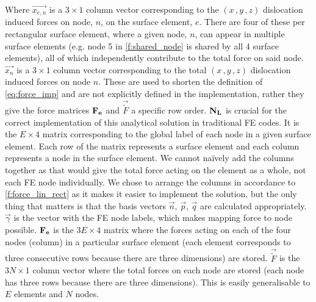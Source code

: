 Where $\vec{x_{e,n}}$ is a $3\times1$ column vector corresponding to the $(x\,,y\,,z)$ dislocation induced forces on node, $n$, on the surface element, $e$. There are four of these per rectangular surface element, where a given node, $n$, can appear in multiple surface elements (e.g. node 5 in \cref{f:shared_node} is shared by all 4 surface elements), all of which independently contribute to the total force on said node. $\vec{x_n}$ is a $3\times1$ column vector corresponding to the total $(x\,,y\,,z)$ dislocation induced forces on node $n$. These are used to shorten the definition of \cref{eq:force_imp} and are not explicitly defined in the implementation, rather they give the force matrices $\mathbf{F_{e}}$ and $\vec{\tilde{F}}$ a specific row order. $\mathbf{N_{L}}$ is crucial for the correct implementation of this analytical solution in traditional FE codes. It is the $E\times4$ matrix corresponding to the global label of each node in a given surface element. Each row of the matrix represents a surface element and each column represents a node in the surface element. We cannot na\"ively add the columns together as that would give the total force acting on the element as a whole, not each FE node individually. We chose to arrange the columns in accordance to \cref{f:force_lin_rect} as it makes it easier to implement the solution, but the only thing that matters is that the basis vectors $\vec{n},\,\vec{p},\,\vec{q}$ are calculated appropriately. $\vec{\gamma}$ is the vector with the FE node labels, which makes mapping force to node possible. $\mathbf{F_{e}}$ is the $3E \times 4$ matrix where the forces acting on each of the four nodes (column) in a particular surface element (each element corresponds to three consecutive rows because there are three dimensions) are stored. $\vec{\tilde{F}}$ is the $3N\times1$ column vector where the total forces on each node are stored (each node has three rows because there are three dimensions). This is easily generalisable to $E$ elements and $N$ nodes.

